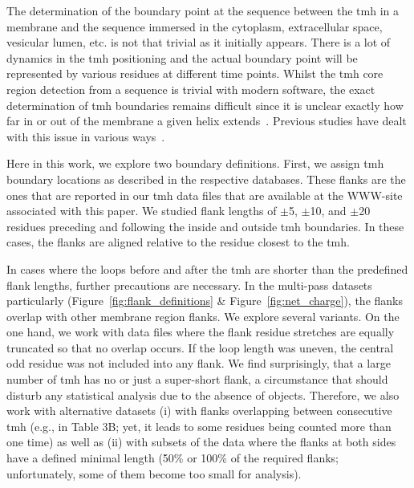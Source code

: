 The determination of the boundary point at the sequence between the \gls{tmh} in a membrane and the sequence immersed in the cytoplasm, extracellular space, vesicular lumen, etc.
is not that trivial as it initially appears.
There is a lot of dynamics in the \gls{tmh} positioning and the actual boundary point will be represented by various residues at different time points.
Whilst the \gls{tmh} core region detection from a sequence is trivial with modern software, the exact determination of \gls{tmh} boundaries remains difficult since it is unclear exactly how far in or out of the membrane a given helix extends~\cite{Ojemalm2013}.
Previous studies have dealt with this issue in various ways~\cite{Sharpe2010,Baeza-Delgado2013,Pogozheva2013, White2008}.

Here in this work, we explore two boundary definitions.
First, we assign \gls{tmh} boundary locations as described in the respective databases.
These flanks are the ones that are reported in our \gls{tmh} data files that are available at the WWW-site associated with this paper.
We studied flank lengths of $\pm$5, $\pm$10, and $\pm$20 residues preceding and following the inside and outside \gls{tmh} boundaries.
In these cases, the flanks are aligned relative to the residue closest to the \gls{tmh}.

In cases where the loops before and after the \gls{tmh} are shorter than the predefined flank lengths, further precautions are necessary.
In the multi-pass datasets particularly (Figure~\ref{fig:flank_definitions} \& Figure~\ref{fig:net_charge}), the flanks overlap with other membrane region flanks.
We explore several variants.
On the one hand, we work with data files where the flank residue stretches are equally truncated so that no overlap occurs.
If the loop length was uneven, the central odd residue was not included into any flank.
We find surprisingly, that a large number of \gls{tmh} has no or just a super-short flank, a circumstance that should disturb any statistical analysis due to the absence of objects.
Therefore, we also work with alternative datasets (i) with flanks overlapping between consecutive \gls{tmh} (e.g., in Table 3B; yet, it leads to some residues being counted more than one time) as well as (ii) with subsets of the data where the flanks at both sides have a defined minimal length (50\% or 100\% of the required flanks; unfortunately, some of them become too small for analysis).

